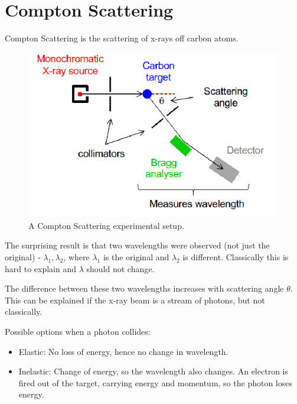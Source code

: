 \section*{Compton Scattering}
Compton Scattering is the scattering of x-rays off carbon atoms.

\begin{figure}[H]
    \centering
    \includegraphics{figures/lec03-06.png}
     \caption{A Compton Scattering experimental setup.}
\end{figure}

The surprising result is that two wavelengths were observed (not just the original) - $\lambda_1, \lambda_2$, where $\lambda_1$ is the original and $\lambda_2$ is different. Classically this is hard to explain and $\lambda$ should not change.

The difference between these two wavelengths increases with scattering angle $\theta$. This can be explained if the x-ray beam is a stream of photons, but not classically.

Possible options when a photon collides:
\begin{itemize}
    \item Elastic: No loss of energy, hence no change in wavelength.
    \item Inelastic: Change of energy, so the wavelength also changes. An electron is fired out of the target, carrying energy and momentum, so the photon loses energy.
\end{itemize}

